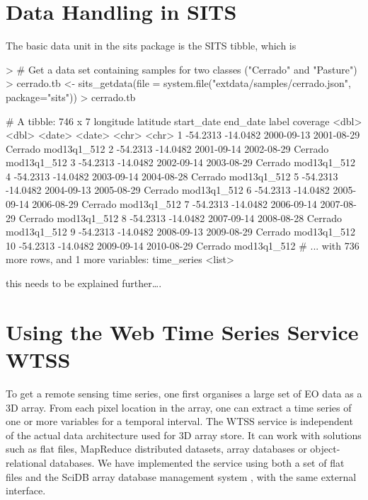 \documentclass[article]{jss}
\begin{document}
\section{Data Handling in SITS}\label{data-handling-in-sits}

The basic data unit in the sits package is the SITS tibble, which is

\begin{CodeChunk}

\begin{CodeInput}
> # Get a data set containing samples for two classes ("Cerrado" and "Pasture")
> cerrado.tb <- sits_getdata(file = system.file("extdata/samples/cerrado.json", package="sits"))
> cerrado.tb
\end{CodeInput}

\begin{CodeOutput}
# A tibble: 746 x 7
   longitude latitude start_date   end_date   label    coverage
       <dbl>    <dbl>     <date>     <date>   <chr>       <chr>
 1  -54.2313 -14.0482 2000-09-13 2001-08-29 Cerrado mod13q1_512
 2  -54.2313 -14.0482 2001-09-14 2002-08-29 Cerrado mod13q1_512
 3  -54.2313 -14.0482 2002-09-14 2003-08-29 Cerrado mod13q1_512
 4  -54.2313 -14.0482 2003-09-14 2004-08-28 Cerrado mod13q1_512
 5  -54.2313 -14.0482 2004-09-13 2005-08-29 Cerrado mod13q1_512
 6  -54.2313 -14.0482 2005-09-14 2006-08-29 Cerrado mod13q1_512
 7  -54.2313 -14.0482 2006-09-14 2007-08-29 Cerrado mod13q1_512
 8  -54.2313 -14.0482 2007-09-14 2008-08-28 Cerrado mod13q1_512
 9  -54.2313 -14.0482 2008-09-13 2009-08-29 Cerrado mod13q1_512
10  -54.2313 -14.0482 2009-09-14 2010-08-29 Cerrado mod13q1_512
# ... with 736 more rows, and 1 more variables: time_series <list>
\end{CodeOutput}
\end{CodeChunk}

this needs to be explained further\ldots{}.

\section{Using the Web Time Series Service
WTSS}\label{using-the-web-time-series-service-wtss}

To get a remote sensing time series, one first organises a large set of
EO data as a 3D array. From each pixel location in the array, one can
extract a time series of one or more variables for a temporal interval.
The WTSS service is independent of the actual data architecture used for
3D array store. It can work with solutions such as flat files, MapReduce
distributed datasets, array databases or object-relational databases. We
have implemented the service using both a set of flat files and the
SciDB array database management system \citep{Stonebraker2013}, with the
same external interface.
\end{document}
